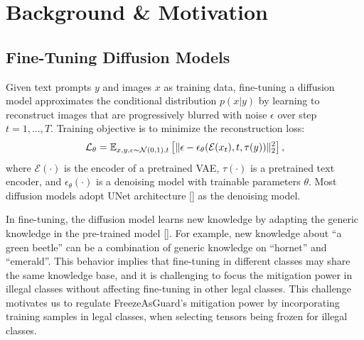 \documentclass{article}
\begin{document}
\vspace{-0.1in}
\section{Background \& Motivation}




\subsection{Fine-Tuning Diffusion Models}
Given text prompts $y$ and images $x$ as training data, fine-tuning a diffusion model approximates the conditional distribution $p(x|y)$ by learning to reconstruct images that are progressively blurred with noise $\epsilon$ over step $t=1,...,T$. Training objective is to minimize the reconstruction loss:
\vspace{-0.05in}
\begin{align}\label{eq:dm_loss}
    \mathcal{L}_{\theta} = \mathbb{E}_{x,y,\epsilon \sim \mathcal{N}(0,1),t}\left[\|\epsilon - \epsilon_{\theta}(\mathcal{E}(x_t), t, \tau(y))\|^2_2\right],
    \vspace{-0.1in}
\end{align}
where $\mathcal{E}(\cdot)$ is the encoder of a pretrained VAE, $\tau(\cdot)$ is a pretrained text encoder, and $\epsilon_{\theta}(\cdot)$ is a denoising model with trainable parameters $\theta$. Most diffusion models adopt UNet architecture [] as the denoising model.


In fine-tuning, the diffusion model learns new knowledge by adapting the generic knowledge in the pre-trained model []. For example, new knowledge about ``a green beetle'' can be a combination of generic knowledge on ``hornet'' and ``emerald''. This behavior implies that fine-tuning in different classes may share the same knowledge base, and it is challenging to focus the mitigation power in illegal classes without affecting fine-tuning in other legal classes. This challenge motivates us to regulate FreezeAsGuard's mitigation power by incorporating training samples in legal classes, when selecting tensors being frozen for illegal classes.
\end{document}
